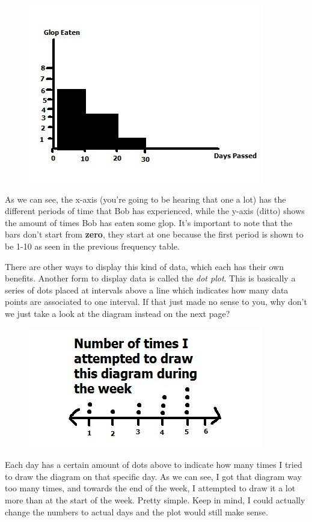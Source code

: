 \documentclass[11pt]{article}
\begin{document}
\clearpage{}
\begin{figure}[htp]
\centering
\includegraphics[scale=1.00]{HistoGramImage4.jpg}
\end{figure}

As we can see, the x-axis (you're going to be hearing that one a lot) has the different periods of time that Bob has experienced, while the y-axis (ditto) shows the amount of times Bob has eaten some glop. It's important to note that the bars don't start from \textbf{zero}, they start at one because the first period is shown to be 1-10 as seen in the previous frequency table.

There are other ways to display this kind of data, which each has their own benefits. Another form to display data is called the \emph{dot plot}. This is basically a series of dots placed at intervals above a line which indicates how many data points are associated to one interval. If that just made no sense to you, why don't we just take a look at the diagram instead on the next page?

\clearpage{}
\begin{figure}[htp]
\centering
\includegraphics[scale=1.00]{DotPlotImage5.jpg}
\end{figure}

Each day has a certain amount of dots above to indicate how many times I tried to draw the diagram on that specific day. As we can see, I got that diagram way too many times, and towards the end of the week, I attempted to draw it a lot more than at the start of the week. Pretty simple. Keep in mind, I could actually change the numbers to actual days and the plot would still make sense.
\end{document}
